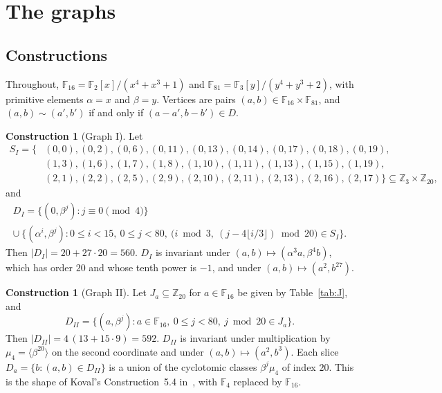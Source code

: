 \documentclass[11pt]{amsart}
\theoremstyle{definition}
\newtheorem{construction}[theorem]{Construction}
\newcommand{\F}{\mathbb{F}}
\newcommand{\Z}{\mathbb{Z}}
\begin{document}
\section{The graphs}\label{sec:graphs}

\subsection{Constructions}
Throughout, $\F_{16}=\F_2[x]/(x^4+x^3+1)$ and $\F_{81}=\F_3[y]/(y^4+y^3+2)$, with primitive elements $\alpha=x$ and $\beta=y$. Vertices are pairs $(a,b)\in\F_{16}\times\F_{81}$, and $(a,b)\sim(a',b')$ if and only if $(a-a',b-b')\in D$.

\begin{construction}[Graph I]\label{con:I}
Let
\[
\begin{aligned}
S_I=\{&(0,0),(0,2),(0,6),(0,11),(0,13),(0,14),(0,17),(0,18),(0,19),\\
&(1,3),(1,6),(1,7),(1,8),(1,10),(1,11),(1,13),(1,15),(1,19),\\
&(2,1),(2,2),(2,5),(2,9),(2,10),(2,11),(2,13),(2,16),(2,17)\}\subseteq\Z_3\times\Z_{20},
\end{aligned}
\]
and
\begin{multline*}
D_I=\{(0,\beta^{j}):j\equiv0\pmod 4\}\\
\cup\ \bigl\{(\alpha^i,\beta^j):0\le i<15,\ 0\le j<80,\ \bigl(i\bmod 3,\ (j-4\lfloor i/3\rfloor)\bmod 20\bigr)\in S_I\bigr\}.
\end{multline*}
Then $|D_I|=20+27\cdot20=560$. $D_I$ is invariant under $(a,b)\mapsto(\alpha^3a,\beta^4b)$, which has order $20$ and whose tenth power is $-1$, and under $(a,b)\mapsto(a^2,b^{27})$.
\end{construction}

\begin{construction}[Graph II]\label{con:II}
Let $J_a\subseteq\Z_{20}$ for $a\in\F_{16}$ be given by Table~\ref{tab:J}, and
\[
D_{II}=\{(a,\beta^j):a\in\F_{16},\ 0\le j<80,\ j\bmod 20\in J_a\}.
\]
Then $|D_{II}|=4\,(13+15\cdot9)=592$. $D_{II}$ is invariant under multiplication by $\mu_4=\langle\beta^{20}\rangle$ on the second coordinate and under $(a,b)\mapsto(a^2,b^3)$. Each slice $D_a=\{b:(a,b)\in D_{II}\}$ is a union of the cyclotomic classes $\beta^j\mu_4$ of index $20$. This is the shape of Kova\v{l}'s Construction~5.4 in~\cite{KovalNew}, with $\F_4$ replaced by $\F_{16}$.
\end{construction}
\end{document}
